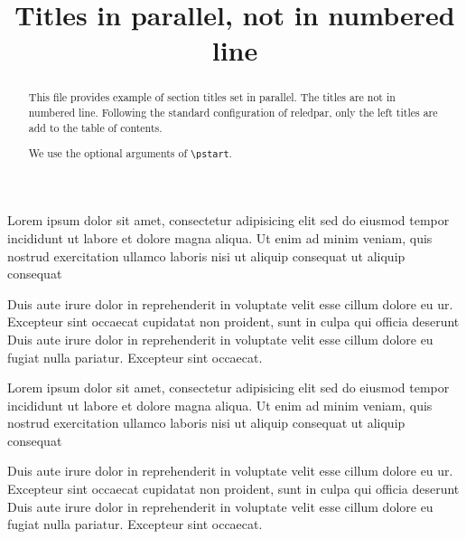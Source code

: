 \documentclass{article}
\begin{document}
\begin{english}
\date{}
\title{Titles in parallel, not in numbered line}
\maketitle
\begin{abstract}
This file provides example of section titles set in parallel. The titles are not in numbered line. Following the standard configuration of reledpar, only the left titles are add to the table of contents.

We use the optional arguments of \verb+\pstart+. 
\end{abstract}
\end{english}

\tableofcontents


\begin{pages}

\begin{Leftside}
\beginnumbering

Lorem ipsum dolor sit amet, consectetur adipisicing elit
sed do eiusmod tempor incididunt ut labore et dolore
magna aliqua. Ut enim ad minim veniam, quis nostrud
exercitation ullamco laboris nisi
ut aliquip  consequat ut aliquip consequat
\pend

Duis aute irure dolor in reprehenderit
in voluptate velit esse cillum dolore eu ur. Excepteur sint occaecat
cupidatat non proident, sunt in culpa qui officia deserunt
Duis aute irure dolor in reprehenderit
in voluptate velit esse cillum dolore eu fugiat nulla
pariatur. Excepteur sint occaecat.
\pend

Lorem ipsum dolor sit amet, consectetur adipisicing elit
sed do eiusmod tempor incididunt ut labore et dolore
magna aliqua. Ut enim ad minim veniam, quis nostrud
exercitation ullamco laboris nisi
ut aliquip consequat ut aliquip consequat\pend

Duis aute irure dolor in reprehenderit
in voluptate velit esse cillum dolore eu ur. Excepteur sint occaecat
cupidatat non proident, sunt in culpa qui officia deserunt
Duis aute irure dolor in reprehenderit
in voluptate velit esse cillum dolore eu fugiat nulla
pariatur. Excepteur sint occaecat.
\pend


\end{Leftside}
\end{pages}
\end{document}
